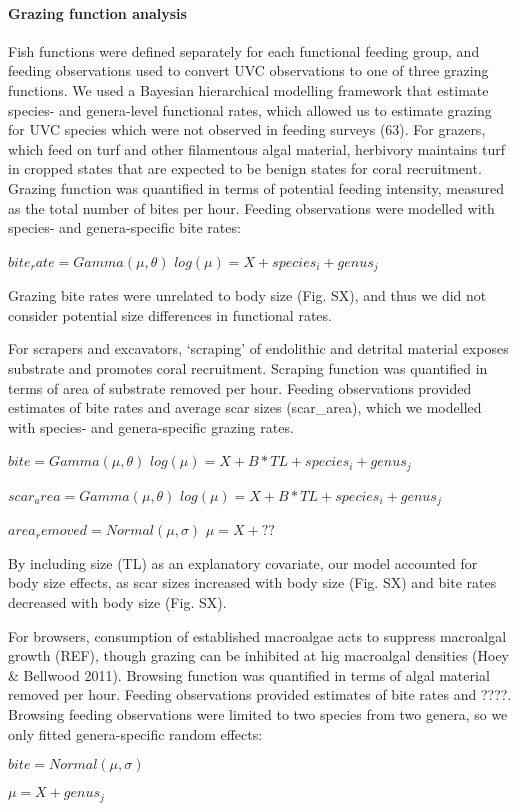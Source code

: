 \documentclass[]{article}
\let\oldparagraph\paragraph
\renewcommand{\paragraph}[1]{\oldparagraph{#1}\mbox{}}
\begin{document}
\paragraph{Grazing function analysis}\label{grazing-function-analysis}

Fish functions were defined separately for each functional feeding
group, and feeding observations used to convert UVC observations to one
of three grazing functions. We used a Bayesian hierarchical modelling
framework that estimate species- and genera-level functional rates,
which allowed us to estimate grazing for UVC species which were not
observed in feeding surveys (63). For grazers, which feed on turf and
other filamentous algal material, herbivory maintains turf in cropped
states that are expected to be benign states for coral recruitment.
Grazing function was quantified in terms of potential feeding intensity,
measured as the total number of bites per hour. Feeding observations
were modelled with species- and genera-specific bite rates:

\(bite_rate = Gamma(\mu, \theta)\)
\(log(\mu) = X + species_i + genus_j\)

Grazing bite rates were unrelated to body size (Fig. SX), and thus we
did not consider potential size differences in functional rates.

For scrapers and excavators, `scraping' of endolithic and detrital
material exposes substrate and promotes coral recruitment. Scraping
function was quantified in terms of area of substrate removed per hour.
Feeding observations provided estimates of bite rates and average scar
sizes (scar\_area), which we modelled with species- and genera-specific
grazing rates.

\(bite = Gamma(\mu, \theta)\)
\(log(\mu) = X + B*TL + species_i + genus_j\)

\(scar_area = Gamma(\mu, \theta)\)
\(log(\mu) = X + B*TL + species_i + genus_j\)

\(area_removed = Normal(\mu, \sigma)\) \(\mu = X + ??\)

By including size (TL) as an explanatory covariate, our model accounted
for body size effects, as scar sizes increased with body size (Fig. SX)
and bite rates decreased with body size (Fig. SX).

For browsers, consumption of established macroalgae acts to suppress
macroalgal growth (REF), though grazing can be inhibited at hig
macroalgal densities (Hoey \& Bellwood 2011). Browsing function was
quantified in terms of algal material removed per hour. Feeding
observations provided estimates of bite rates and ????. Browsing feeding
observations were limited to two species from two genera, so we only
fitted genera-specific random effects:

\(bite = Normal(\mu, \sigma)\)

\(\mu = X + genus_j\)
\end{document}
